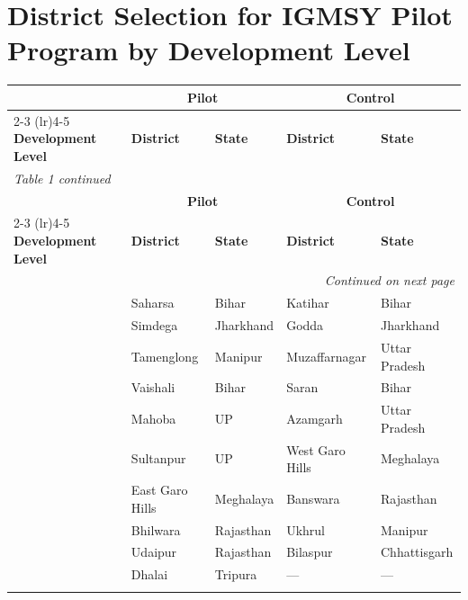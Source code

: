 \documentclass{article}        %
\begin{document}
\newpage 

\section{District Selection for IGMSY Pilot Program by Development Level}
\begin{longtable}{@{}p{2.8cm}p{3.2cm}p{3.2cm}p{3.2cm}p{3.2cm}@{}}
\label{tab:districts} \\

\toprule
 & \multicolumn{2}{c}{\textbf{Pilot}} & \multicolumn{2}{c}{\textbf{Control}} \\
\cmidrule(lr){2-3} \cmidrule(lr){4-5}
\textbf{Development Level} & \textbf{District} & \textbf{State} & \textbf{District} & \textbf{State} \\
\midrule
\endfirsthead

\multicolumn{5}{l}{\small\textit{Table 1 continued}} \\[4pt]
\toprule
 & \multicolumn{2}{c}{\textbf{Pilot}} & \multicolumn{2}{c}{\textbf{Control}} \\
\cmidrule(lr){2-3} \cmidrule(lr){4-5}
\textbf{Development Level} & \textbf{District} & \textbf{State} & \textbf{District} & \textbf{State} \\
\midrule
\endhead

\midrule
\multicolumn{5}{r}{\small\textit{Continued on next page}} \\
\endfoot

\bottomrule
\endlastfoot

\multirow{10}{*}{\textit{Low}}
  & Saharsa        & Bihar         & Katihar          & Bihar          \\
  & Simdega        & Jharkhand     & Godda            & Jharkhand      \\
  & Tamenglong     & Manipur       & Muzaffarnagar    & Uttar Pradesh  \\
  & Vaishali       & Bihar         & Saran            & Bihar          \\
  & Mahoba         & UP            & Azamgarh         & Uttar Pradesh  \\
  & Sultanpur      & UP            & West Garo Hills  & Meghalaya      \\
  & East Garo Hills & Meghalaya    & Banswara         & Rajasthan      \\
  & Bhilwara       & Rajasthan     & Ukhrul           & Manipur        \\
  & Udaipur        & Rajasthan     & Bilaspur         & Chhattisgarh   \\
  & Dhalai         & Tripura       & ---              & ---            \\
\addlinespace[6pt]


\end{longtable}
\end{document}

